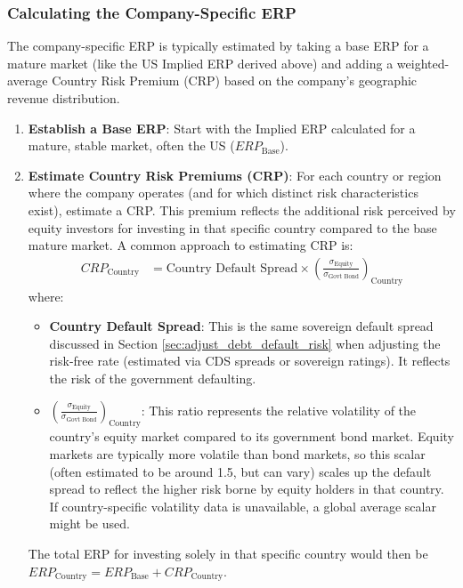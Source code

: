 \subsubsection{Calculating the Company-Specific ERP}
The company-specific ERP is typically estimated by taking a base ERP for a mature market (like the US Implied ERP derived above) and adding a weighted-average Country Risk Premium (CRP) based on the company's geographic revenue distribution.
\begin{enumerate}
    \item \textbf{Establish a Base ERP}: Start with the Implied ERP calculated for a mature, stable market, often the US (\(ERP_{\text{Base}}\)).
    \item \textbf{Estimate Country Risk Premiums (CRP)}: For each country or region where the company operates (and for which distinct risk characteristics exist), estimate a CRP. This premium reflects the additional risk perceived by equity investors for investing in that specific country compared to the base mature market. A common approach to estimating CRP is:
          \begin{align*}
              CRP_{\text{Country}} & = \text{Country Default Spread} \times \left( \frac{\sigma_{\text{Equity}}}{\sigma_{\text{Govt Bond}}} \right)_{\text{Country}}
          \end{align*}
          where:
          \begin{itemize}
              \item \textbf{Country Default Spread}: This is the same sovereign default spread discussed in Section \ref{sec:adjust_debt_default_risk} when adjusting the risk-free rate (estimated via CDS spreads or sovereign ratings). It reflects the risk of the government defaulting.
              \item \textbf{\(\left( \frac{\sigma_{\text{Equity}}}{\sigma_{\text{Govt Bond}}} \right)_{\text{Country}}\)}: This ratio represents the relative volatility of the country's equity market compared to its government bond market. Equity markets are typically more volatile than bond markets, so this scalar (often estimated to be around 1.5, but can vary) scales up the default spread to reflect the higher risk borne by equity holders in that country. If country-specific volatility data is unavailable, a global average scalar might be used.
          \end{itemize}
          The total ERP for investing solely in that specific country would then be \(ERP_{\text{Country}} = ERP_{\text{Base}} + CRP_{\text{Country}}\).

\end{enumerate}

